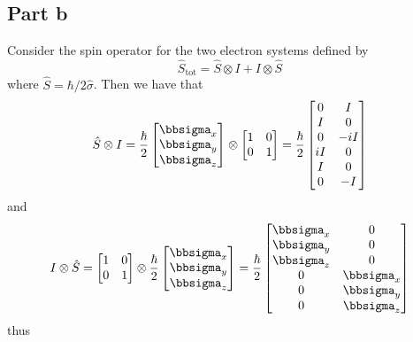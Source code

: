 \documentclass[12pt]{report}
\theoremstyle{custom}
\begin{document}
\subsection*{Part b}
Consider the spin operator for the two electron systems defined by
\begin{equation*}
  \hat{S}_{\text{tot}} = \hat{S} \otimes I + I \otimes \hat{S}
\end{equation*}
where $\hat{S} = \hbar/2 \hat{\sigma}$. Then we have that
\begin{equation*}
\hat{S} \otimes I = \frac{\hbar}{2} \begin{bmatrix}
\bbsigma_x \\ \bbsigma_y \\ \bbsigma_z
\end{bmatrix}
\otimes \begin{bmatrix}
1 & 0 \\ 0 & 1
\end{bmatrix} = \frac{\hbar}{2} \begin{bmatrix} 
0 & I \\ I & 0 \\ 0 & -i I \\iI & 0 \\ I & 0 \\ 0 & -I
\end{bmatrix} 
\end{equation*}
and
\begin{equation*}
I \otimes \hat{S} = \begin{bmatrix}
1 & 0 \\ 0 & 1
\end{bmatrix} \otimes \frac{\hbar}{2} \begin{bmatrix}
\bbsigma_x \\ \bbsigma_y \\ \bbsigma_z
\end{bmatrix} = \frac{\hbar}{2} \begin{bmatrix}
\bbsigma_x & 0 \\ \bbsigma_y & 0 \\ \bbsigma_z & 0 \\ 0 & \bbsigma_x \\ 0 & \bbsigma_y \\ 0 & \bbsigma_z
\end{bmatrix}
\end{equation*}
thus
\end{document}
